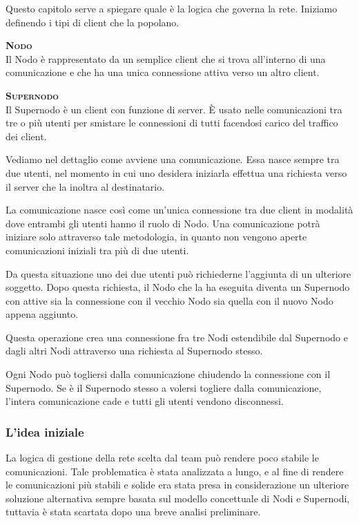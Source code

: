 Questo capitolo serve a spiegare quale è la logica che governa la rete. Iniziamo definendo i tipi di client che la popolano.
\begin{description}
	\item{\scshape\bfseries Nodo}\\
	Il Nodo è rappresentato da un semplice client che si trova all'interno di una comunicazione e che ha una unica connessione attiva verso un altro client.
	\item{\scshape\bfseries Supernodo}\\
	Il Supernodo è un client con funzione di server. È usato nelle comunicazioni tra tre o più utenti per smistare le connessioni di tutti facendosi carico del traffico dei client.
\end{description}

Vediamo nel dettaglio come avviene una comunicazione. Essa nasce sempre tra due utenti, nel momento in cui uno desidera iniziarla effettua una richiesta verso il server che la inoltra al destinatario.

La comunicazione nasce così come un'unica connessione tra due client in modalità \underline{} dove entrambi gli utenti hanno il ruolo di Nodo. Una comunicazione potrà iniziare solo attraverso tale metodologia, in quanto non vengono aperte comunicazioni iniziali tra più di due utenti.

Da questa situazione uno dei due utenti può richiederne l'aggiunta di un ulteriore soggetto. Dopo questa richiesta, il Nodo che la ha eseguita diventa un Supernodo con attive sia la connessione con il vecchio Nodo sia quella con il nuovo Nodo appena aggiunto.

Questa operazione crea una connessione fra tre Nodi estendibile dal Supernodo e dagli altri Nodi attraverso una richiesta al Supernodo stesso.


Ogni Nodo può togliersi dalla comunicazione chiudendo la connessione con il Supernodo. Se è il Supernodo stesso a volersi togliere dalla comunicazione, l'intera comunicazione cade e tutti gli utenti vendono disconnessi.

\subsubsection{L'idea iniziale}
La logica di gestione della rete scelta dal team può rendere poco stabile le comunicazioni. Tale problematica è stata analizzata a lungo, e al fine di rendere le comunicazioni più stabili e solide era stata presa in considerazione un ulteriore soluzione alternativa sempre basata sul modello concettuale di Nodi e Supernodi, tuttavia è stata scartata dopo una breve analisi preliminare.

